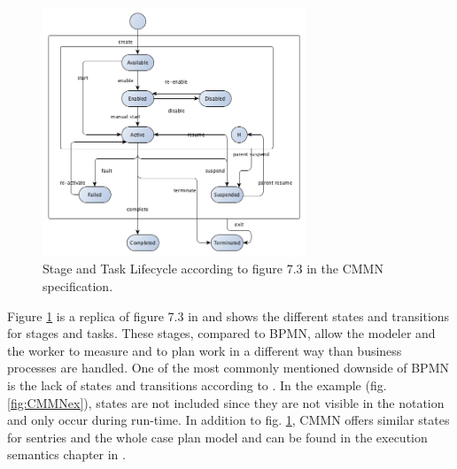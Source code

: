 \begin{figure}
  \centering
\includegraphics[width=0.7\textwidth]{../figures/chapter_indicators/Stage_and_Task_Lifecycle_CMMN.png} 
\caption{Stage and Task Lifecycle according to figure 7.3 in the CMMN specification.}
  \label{fig:CMMNstates}
\end{figure}

Figure \ref{fig:CMMNstates} is a replica of figure 7.3 in \cite{CMMNspec2014} and shows the different states and transitions for stages and tasks. These stages, compared to BPMN, allow the modeler and the worker to measure and to plan work in a different way than business processes are handled. One of the most commonly mentioned downside of BPMN is the lack of states and transitions according to \cite{Recker2010}. In the example (fig. \ref{fig:CMMNex}), states are not included since they are not visible in the notation and only occur during run-time. In addition to fig. \ref{fig:CMMNstates}, CMMN offers similar states for sentries and the whole case plan model and can be found in the execution semantics chapter in \cite{CMMNspec2014}. \\

